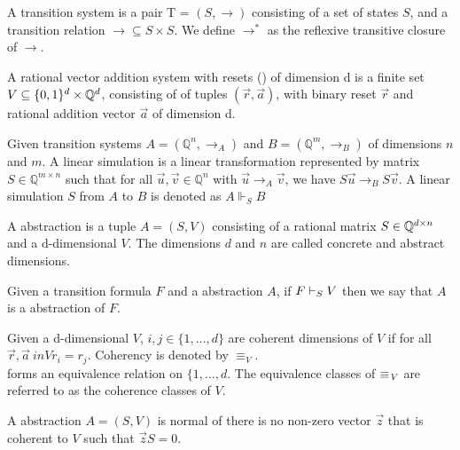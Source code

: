 \begin{mydef}
A transition system is a pair T = $(S, \rightarrow)$ consisting of a set of states $S$, and a transition relation $\rightarrow \subseteq S \times S$. We define $\rightarrow^*$ as the reflexive transitive closure of $\rightarrow$.
\end{mydef}

\begin{mydef}
A rational vector addition system with resets (\qvasr) of dimension d is a finite set $V \subseteq \{0, 1\}^d \times \mathbb{Q}^d$, consisting of of tuples $(\vec{r}, \vec{a})$, with binary reset $\vec{r}$ and rational addition vector $\vec{a}$ of dimension d.
\end{mydef}

\begin{mydef}
Given transition systems $A = (\mathbb{Q}^n, \rightarrow_A)$ and $B = (\mathbb{Q}^m, \rightarrow_B)$ of dimensions $n$ and $m$. A linear simulation is a linear transformation represented by matrix $S \in \mathbb{Q}^{m \times n}$ such that for all $\vec{u}, \vec{v} \in \mathbb{Q}^n$ with $\vec{u} \rightarrow_A \vec{v}$, we have $S\vec{u} \rightarrow_B S\vec{v}$. A linear simulation $S$ from $A$ to $B$ is denoted as $A \Vdash_{S} B$
\end{mydef}

\begin{mydef}
A \qvasr abstraction is a tuple $A = (S, V)$ consisting of a rational matrix $S \in \mathbb{Q}^{d \times n}$ and a d-dimensional \qvasr $V$. The dimensions $d$ and $n$ are called concrete and abstract dimensions.
\end{mydef}

Given a transition formula $F$ and a \qvasr abstraction $A$, if $F \vdash_{S} V$ then we say that $A$ is a \qvasr abstraction of $F$.

\begin{mydef}
Given a d-dimensional \qvasr $\mathit{V}$,  $i, j \in \{1 ,\ldots, d\}$ are coherent dimensions of $\mathit{V}$ if for all $\vec{r}, \vec{a} \ in \mathit{V} r_i = r_j$. Coherency is denoted by $\equiv_{\mathit{V}}$. \\
\coherent forms an equivalence relation on $\{1, \ldots, d$. The equivalence classes of $\equiv_{\mathit{V}}$ are referred to as the coherence classes of $\mathit{V}$.
\end{mydef}

\begin{mydef}
A \qvasr abstraction $\mathit{A = (S, V)}$ is normal of there is no non-zero vector $\vec{z}$ that is coherent to $\mathit{V}$ such that $\vec{z}S = 0$.
\end{mydef}